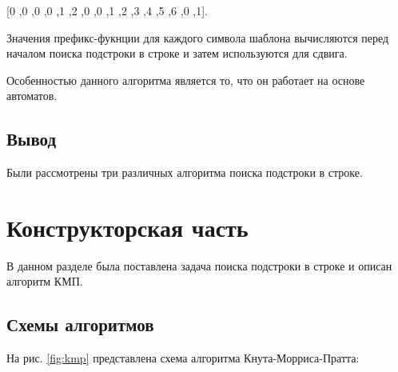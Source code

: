 \documentclass[a4paper, 14pt]{report}
\begin{document}
[0 ,0 ,0 ,0 ,1 ,2 ,0 ,0 ,1 ,2 ,3 ,4 ,5 ,6 ,0 ,1].

Значения префикс-фукнции для каждого символа шаблона вычисляются перед началом поиска подстроки в строке и затем используются для сдвига.
	
	Особенностью данного алгоритма является то, что он работает на основе автоматов. 
	

	\section{Вывод}
	Были рассмотрены три различных алгоритма поиска подстроки в строке.
	
	\newpage
	\chapter{Конструкторская часть}
	
	В данном разделе была поставлена задача поиска подстроки в строке и описан алгоритм КМП.
	
	\section{Схемы алгоритмов}
	
	На рис. \ref{fig:kmp} представлена схема алгоритма Кнута-Морриса-Пратта:
    
\end{document}
